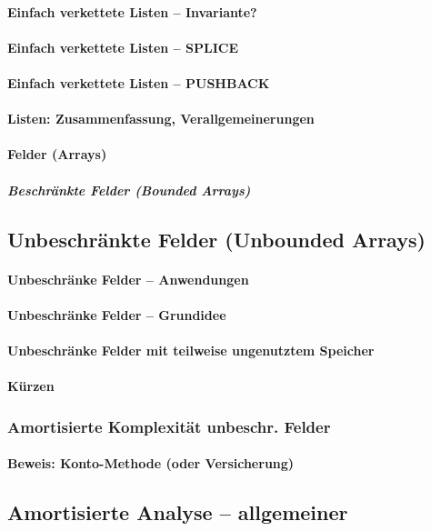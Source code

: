 \paragraph{Einfach verkettete Listen – Invariante?}
\paragraph{Einfach verkettete Listen – SPLICE}
\paragraph{Einfach verkettete Listen – PUSHBACK}
\paragraph{Listen: Zusammenfassung, Verallgemeinerungen}
\paragraph{Felder (Arrays)}
\subparagraph{Beschränkte Felder (Bounded Arrays)}
\subsection{Unbeschränkte Felder (Unbounded Arrays)}
\paragraph{Unbeschränke Felder – Anwendungen}
\paragraph{Unbeschränke Felder – Grundidee}
\paragraph{Unbeschränke Felder
mit teilweise ungenutztem Speicher}
\paragraph{Kürzen}
\subsubsection{Amortisierte Komplexität unbeschr. Felder}
\paragraph{Beweis: Konto-Methode (oder Versicherung)}
\subsection{Amortisierte Analyse – allgemeiner}
